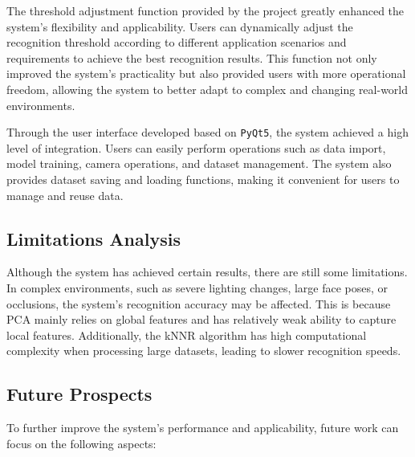 \documentclass{article}
\begin{document}
The threshold adjustment function provided by the project greatly enhanced the system's flexibility and applicability. Users can dynamically adjust the recognition threshold according to different application scenarios and requirements to achieve the best recognition results. This function not only improved the system's practicality but also provided users with more operational freedom, allowing the system to better adapt to complex and changing real-world environments.

Through the user interface developed based on \texttt{PyQt5}, the system achieved a high level of integration. Users can easily perform operations such as data import, model training, camera operations, and dataset management. The system also provides dataset saving and loading functions, making it convenient for users to manage and reuse data.

\subsection{Limitations Analysis}
Although the system has achieved certain results, there are still some limitations. In complex environments, such as severe lighting changes, large face poses, or occlusions, the system's recognition accuracy may be affected. This is because PCA mainly relies on global features and has relatively weak ability to capture local features. Additionally, the kNNR algorithm has high computational complexity when processing large datasets, leading to slower recognition speeds.

\subsection{Future Prospects}
To further improve the system's performance and applicability, future work can focus on the following aspects:
\end{document}
